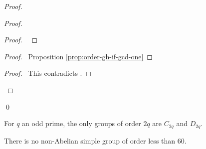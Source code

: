 \begin{proof}
\begin{proof}
	\begin{proof}
		\pf\ 
	\end{proof}
	\begin{proof}
		\pf\ Proposition \ref{prop:order-gh-if-gcd-one}
	\end{proof}
	\qedstep
	\begin{proof}
		\pf\ This contradicts .
	\end{proof}
\end{proof}
\qed
\end{proof}

\begin{cor}
For $q$ an odd prime, the only groups of order $2q$ are $C_{2q}$ and $D_{2q}$.
\end{cor}

\begin{prop}
There is no non-Abelian simple group of order less than 60.
\end{prop}

